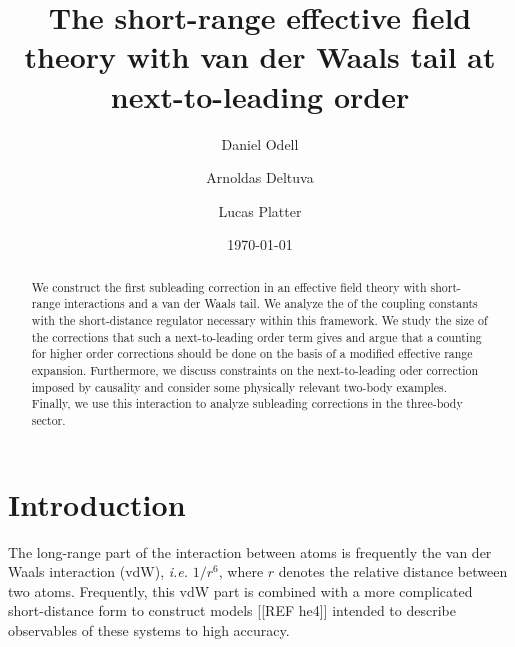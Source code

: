 \documentclass[aps,preprint,superscriptaddress]{revtex4-1}
\begin{document}
\title{The short-range effective field theory with van der Waals tail at next-to-leading order}
\author{Daniel Odell}
\author{Arnoldas Deltuva}
\author{Lucas Platter}
\date{\today}

\listoftodos

\begin{abstract}
  We construct the first subleading correction in an effective field
  theory with short-range interactions and a van der Waals tail. We
  analyze the of the coupling constants with the short-distance
  regulator necessary within this framework. We study the size of the
  corrections that such a next-to-leading order term gives and argue
  that a counting for higher order corrections should be done on the
  basis of a modified effective range expansion. Furthermore, we
  discuss constraints on the next-to-leading oder correction imposed
  by causality and consider some physically relevant two-body
  examples. Finally, we use this interaction to analyze subleading
  corrections in the three-body sector.
\end{abstract}

\smallskip
\maketitle

\newpage
\section{Introduction}
\label{sec:introduction}
The long-range part of the interaction between atoms is frequently the
van der Waals interaction (vdW), {\it i.e.} $1/r^6$, where $r$ denotes
the relative distance between two atoms. Frequently, this vdW part is
combined with a more complicated short-distance form to construct
models [[REF he4]] intended to describe observables of these systems
to high accuracy.
\end{document}
